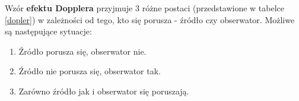 Wzór \textbf{efektu Dopplera} przyjmuje 3 różne postaci (przedstawione w tabelce \ref{dopler}) w zależności od tego, kto się porusza - źródło czy obserwator. Możliwe są następujące sytuacje:


\begin{enumerate}
    \item Źródło porusza się, obserwator nie.
    \item Źródło nie porusza się, obserwator tak.
    \item Zarówno źródło jak i obserwator się poruszają.
\end{enumerate}

